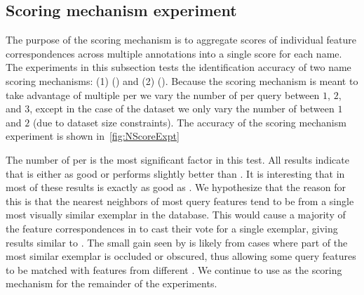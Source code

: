    \subsection{Scoring mechanism experiment}\label{sub:exptscoremech}  

        The purpose of the scoring mechanism is to aggregate scores of
          individual feature correspondences across multiple annotations
          into a single score for each name.
        The experiments in this subsection tests the identification
          accuracy of two name scoring mechanisms:
        (1) \cscoring{} (\csum{}) and
        (2) \nscoring{} (\nsum{}).
        Because the scoring mechanism is meant to take advantage of
          multiple \exemplars{} per \name{} we vary the number of
          \exemplars{} per query between $1$, $2$, and $3$, except in the
          case of the \girmmasterI{} dataset we only vary the number of
          \exemplars{} between $1$ and $2$ (due to dataset size
          constraints).
        The accuracy of the scoring mechanism experiment is shown
          in~\cref{fig:NScoreExpt}

        \NScoreExpt{}

        The number of \exemplars{} per \name{} is the most significant
          factor in this test.
        All results indicate that \nsum{} is either as good or performs
          slightly better than \csum{}.
        It is interesting that in most of these results \nsum{} is
          exactly as good as \csum{}.
        We hypothesize that the reason for this is that the nearest
          neighbors of most query features tend to be from a single most
          visually similar exemplar in the database.
        This would cause a majority of the feature correspondences in
          \nsum{} to cast their vote for a single exemplar, giving
          results similar to \csum{}.
        The small gain seen by \nsum{} is likely from cases where part
          of the most similar exemplar is occluded or obscured, thus
          allowing some query features to be matched with features from
          different \exemplars{}.
        We continue to use \nsum{} as the scoring mechanism for the
          remainder of the experiments.
        

